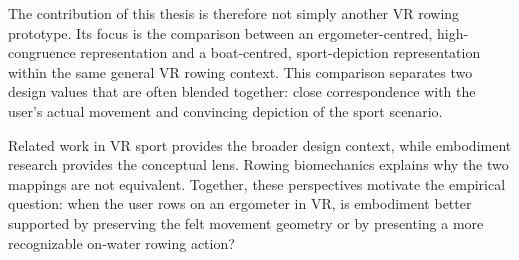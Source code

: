 The contribution of this thesis is therefore not simply another VR rowing prototype. Its focus is the comparison between an ergometer-centred, high-congruence representation and a boat-centred, sport-depiction representation within the same general VR rowing context. This comparison separates two design values that are often blended together: close correspondence with the user's actual movement and convincing depiction of the sport scenario.

Related work in VR sport provides the broader design context, while embodiment research provides the conceptual lens. Rowing biomechanics explains why the two mappings are not equivalent. Together, these perspectives motivate the empirical question: when the user rows on an ergometer in VR, is embodiment better supported by preserving the felt movement geometry or by presenting a more recognizable on-water rowing action?
